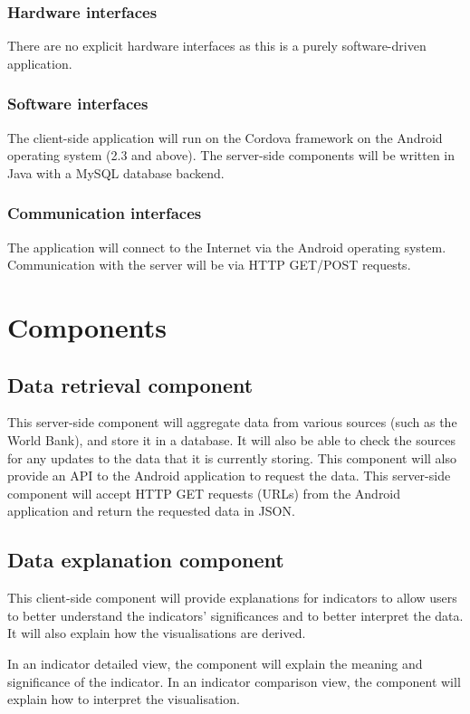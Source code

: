\documentclass[12pt,a4paper,twoside]{article}
\begin{document}
\subsubsection{Hardware interfaces}
There are no explicit hardware interfaces as this is a purely software-driven application.

\subsubsection{Software interfaces}
The client-side application will run on the Cordova framework on the Android operating system (2.3 and above). The server-side components will be written in Java with a MySQL database backend.

\subsubsection{Communication interfaces}
The application will connect to the Internet via the Android operating system. Communication with the server will be via HTTP GET/POST requests.

\section{Components}

\subsection{Data retrieval component}
This server-side component will aggregate data from various sources (such as the World Bank), and store it in a database. It will also be able to check the sources for any updates to the data that it is currently storing. This component will also provide an API to the Android application to request the data. This server-side component will accept HTTP GET requests (URLs) from the Android application and return the requested data in JSON.

\subsection{Data explanation component}
This client-side component will provide explanations for indicators to allow users to better understand the indicators' significances and to better interpret the data. It will also explain how the visualisations are derived.

In an indicator detailed view, the component will explain the meaning and significance of the indicator. In an indicator comparison view, the component will explain how to interpret the visualisation.
\end{document}
